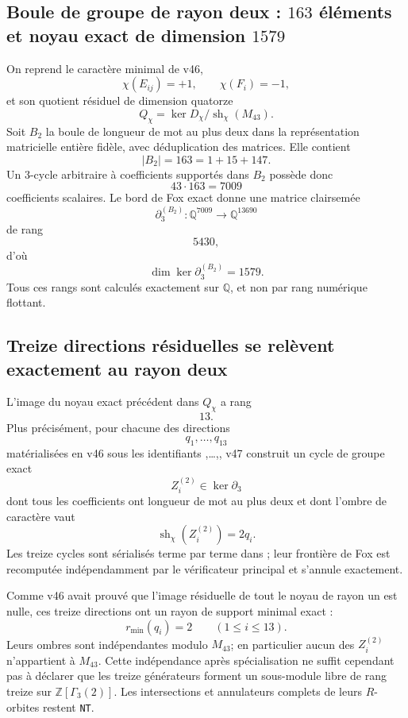 \documentclass[11pt,a4paper]{article}
\newcommand{\certNT}{\texttt{NT}}
\begin{document}
\subsection{Boule de groupe de rayon deux : $163$ éléments et noyau exact de dimension $1579$}

On reprend le caractère minimal de v46,
\[
 \chi(E_{ij})=+1,\qquad \chi(F_i)=-1,
\]
et son quotient résiduel de dimension quatorze
\[
 Q_\chi=\ker D_\chi/\operatorname{sh}_\chi(M_{43}).
\]
Soit $B_2$ la boule de longueur de mot au plus deux dans la représentation matricielle entière fidèle, avec déduplication des matrices. Elle contient
\[
 \boxed{|B_2|=163=1+15+147.}
\]
Un $3$-cycle arbitraire à coefficients supportés dans $B_2$ possède donc
\[
 43\cdot163=7009
\]
coefficients scalaires. Le bord de Fox exact donne une matrice clairsemée
\[
 \partial_3^{(B_2)}:\mathbb Q^{7009}\longrightarrow\mathbb Q^{13690}
\]
de rang
\[
 \boxed{5430},
\]
d'où
\[
 \boxed{\dim\ker\partial_3^{(B_2)}=1579.}
\]
Tous ces rangs sont calculés exactement sur $\mathbb Q$, et non par rang numérique flottant.

\subsection{Treize directions résiduelles se relèvent exactement au rayon deux}

L'image du noyau exact précédent dans $Q_\chi$ a rang
\[
 \boxed{13}.
\]
Plus précisément, pour chacune des directions
\[
 q_1,\ldots,q_{13}
\]
matérialisées en v46 sous les identifiants ,\ldots,, v47 construit un cycle de groupe exact
\[
 Z_i^{(2)}\in\ker\partial_3
\]
dont tous les coefficients ont longueur de mot au plus deux et dont l'ombre de caractère vaut
\[
 \boxed{\operatorname{sh}_\chi(Z_i^{(2)})=2q_i.}
\]
Les treize cycles sont sérialisés terme par terme dans ; leur frontière de Fox est recomputée indépendamment par le vérificateur principal et s'annule exactement.

Comme v46 avait prouvé que l'image résiduelle de tout le noyau de rayon un est nulle, ces treize directions ont un rayon de support minimal exact :
\[
 \boxed{r_{\min}(q_i)=2\qquad(1\le i\le13).}
\]
Leurs ombres sont indépendantes modulo $M_{43}$; en particulier aucun des $Z_i^{(2)}$ n'appartient à $M_{43}$. Cette indépendance après spécialisation ne suffit cependant pas à déclarer que les treize générateurs forment un sous-module libre de rang treize sur $\mathbb Z[\Gamma_3(2)]$. Les intersections et annulateurs complets de leurs $R$-orbites restent \certNT{}.
\end{document}
